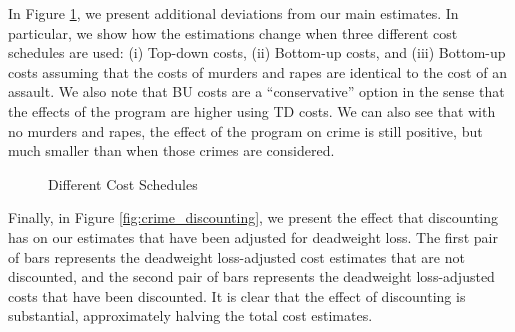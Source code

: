 \noindent In Figure \ref{fig:costs_schedules}, we present additional deviations from our main estimates. In particular, we show how the estimations change when three different cost schedules are used: (i) Top-down costs, (ii) Bottom-up costs, and (iii) Bottom-up costs assuming that the costs of murders and rapes are identical to the cost of an assault. We also note that BU costs are a ``conservative'' option in the sense that the effects of the program are higher using TD costs. We can also see that with no murders and rapes, the effect of the program on crime is still positive, but much smaller than when those crimes are considered. \\

\begin{figure} [H]
\caption{Different Cost Schedules}
\centering  \label{fig:costs_schedules}
{}
\end{figure}

\noindent Finally, in Figure \ref{fig:crime_discounting}, we present the effect that discounting has on our estimates that have been adjusted for deadweight loss. The first pair of bars represents the deadweight loss-adjusted cost estimates that are not discounted, and the second pair of bars represents the deadweight loss-adjusted costs that have been discounted. It is clear that the effect of discounting is substantial, approximately halving the total cost estimates.\\

